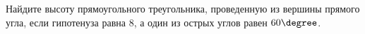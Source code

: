 \begin{ex}
	\begin{condition}
		Найдите высоту прямоугольного треугольника, проведенную из вершины прямого угла, если гипотенуза равна \( 8 \),	а один из острых углов равен \( 60\degree \).
	\end{condition}
\end{ex}